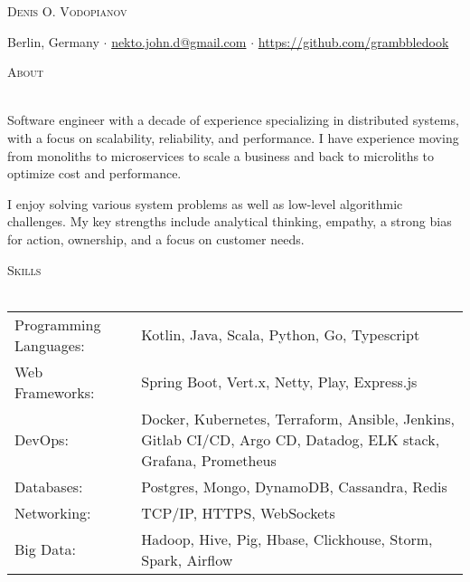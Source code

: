 \documentclass[a4paper]{article}
\makeatletter
\newcommand{\lineunder} {
    \vspace*{-8pt} \\
    \hspace*{-18pt} \hrulefill \\
}
\newcommand{\header} [1] {
        {\hspace*{-18pt}\vspace*{6pt} \textsc{#1}}
    \vspace*{-6pt} \lineunder
}
\def\email{nekto.john.d@gmail.com}
\def\phone{555-55-55}
\makeatother
\begin{document}
    \vspace*{-40pt}


    \vspace*{-10pt}
    \begin{center}
        \Huge \scshape {Denis O. Vodopianov} \\ \vspace{1mm}
    \end{center}

    \begin{center}
        Berlin, Germany $\cdot$
        \href{mailto:\email}{\email} $\cdot$
        \url{https://github.com/grambbledook}\\
    \end{center}

    \header{About}
    \begin{raggedright}

        Software engineer with a decade of experience specializing in distributed systems, with a focus on scalability, reliability, and performance.
        I have experience moving from monoliths to microservices to scale a business and back to microliths
        to optimize cost and performance. \break

        I enjoy solving various system problems as well as low-level algorithmic challenges.
        My key strengths include analytical thinking, empathy, a strong bias for action, ownership, and a focus on customer needs. \\
    \end{raggedright}
    \vspace{2mm}

    \header{Skills}
    \begin{tabularx}{\textwidth}{p{5cm} X}
        Programming Languages: & Kotlin, Java, Scala, Python, Go, Typescript                                                                     \\
        Web Frameworks:        & Spring Boot, Vert.x, Netty, Play, Express.js                                                                    \\
        DevOps:                & Docker, Kubernetes, Terraform, Ansible, Jenkins, Gitlab CI/CD, Argo CD, Datadog, ELK stack, Grafana, Prometheus \\
        Databases:             & Postgres, Mongo, DynamoDB, Cassandra, Redis                                                                     \\
        Networking:            & TCP/IP, HTTPS, WebSockets                                                                                       \\
        Big Data:              & Hadoop, Hive, Pig, Hbase, Clickhouse, Storm, Spark, Airflow                                                     \\
    \end{tabularx}
    \vspace{2mm}
\end{document}
